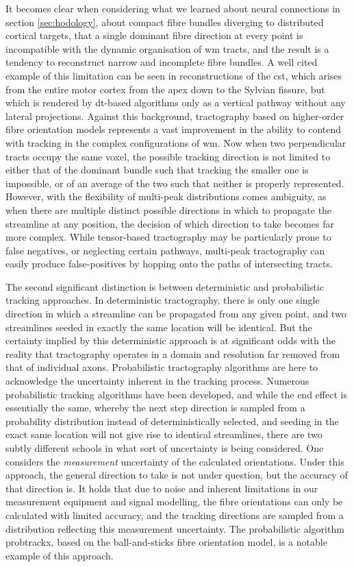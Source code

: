 It becomes clear when considering what we learned about neural connections in section \ref{sec:hodology}, about compact fibre bundles diverging to distributed cortical targets, that a single dominant fibre direction at every point is incompatible with the dynamic organisation of \gls{wm} tracts, and the result is a tendency to reconstruct narrow and incomplete fibre bundles\autocite{Farquharson2013}.
A well cited example of this limitation can be seen in reconstructions of the \gls{cst}, which arises from the entire motor cortex from the apex down to the Sylvian fissure, but which is rendered by \gls{dt}-based algorithms only as a vertical pathway without any lateral projections.
Against this background, tractography based on higher-order fibre orientation models represents a vast improvement in the ability to contend with tracking in the complex configurations of \gls{wm}.
Now when two perpendicular tracts occupy the same voxel, the possible tracking direction is not limited to either that of the dominant bundle such that tracking the smaller one is impossible, or of an average of the two such that neither is properly represented.
However, with the flexibility of multi-peak distributions comes ambiguity, as when there are multiple distinct possible directions in which to propagate the streamline at any position, the decision of which direction to take becomes far more complex.
While tensor-based tractography may be particularly prone to false negatives, or neglecting certain pathways, multi-peak tractography can easily produce false-positives by hopping onto the paths of intersecting tracts.

The second significant distinction is between deterministic and probabilistic tracking approaches.
In deterministic tractography, there is only one single direction in which a streamline can be propagated from any given point, and two streamlines seeded in exactly the same location will be identical.
But the certainty implied by this deterministic approach is at significant odds with the reality that tractography operates in a domain and resolution far removed from that of individual axons.
Probabilistic tractography algorithms are here to acknowledge the uncertainty inherent in the tracking process.
Numerous probabilistic tracking algorithms have been developed, and while the end effect is essentially the same, whereby the next step direction is sampled from a probability distribution instead of deterministically selected, and seeding in the exact same location will not give rise to identical streamlines, there are two subtly different schools in what sort of uncertainty is being considered\autocite{Jeurissen2019}.
One considers the \textit{measurement} uncertainty of the calculated orientations.
Under this approach, the general direction to take is not under question, but the accuracy of that direction is.
It holds that due to noise and inherent limitations in our measurement equipment and signal modelling, the fibre orientations can only be calculated with limited accuracy, and the tracking directions are sampled from a distribution reflecting this measurement uncertainty.
The probabilistic algorithm probtrackx\autocite{Behrens2007}, based on the ball-and-sticks fibre orientation model\autocite{Behrens2003}, is a notable example of this approach.

